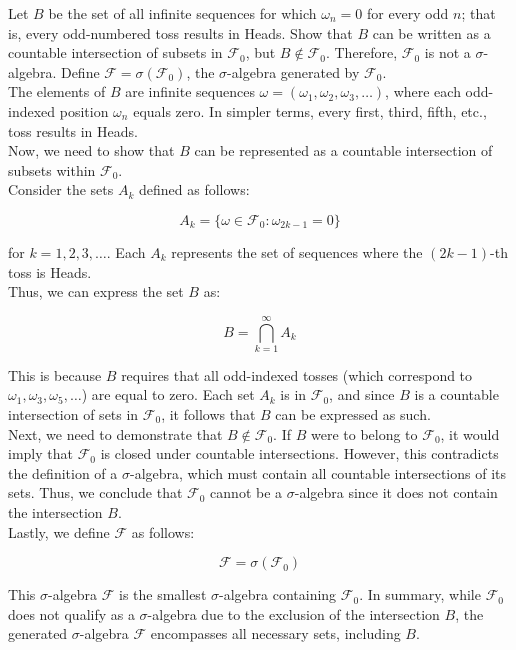 \begin{example}
    Let \( B \) be the set of all infinite sequences for which \( \omega_n = 0 \) for every odd \( n \); that is, every odd-numbered toss results in Heads. Show that \( B \) can be written as a countable intersection of subsets in \( \mathcal{F}_0 \), but \( B \notin \mathcal{F}_0 \). Therefore, \( \mathcal{F}_0 \) is not a \( \sigma \)-algebra. Define \( \mathcal{F} = \sigma(\mathcal{F}_0) \), the \( \sigma \)-algebra generated by \( \mathcal{F}_0 \).\\

    The elements of \( B \) are infinite sequences \( \omega = (\omega_1, \omega_2, \omega_3, \ldots) \), where each odd-indexed position \( \omega_n \) equals zero. In simpler terms, every first, third, fifth, etc., toss results in Heads.\\

    Now, we need to show that \( B \) can be represented as a countable intersection of subsets within \( \mathcal{F}_0 \). \\

    Consider the sets \( A_k \) defined as follows:

    \[
    A_k = \{ \omega \in \mathcal{F}_0 : \omega_{2k-1} = 0 \}
    \]

    for \( k = 1, 2, 3, \ldots \). Each \( A_k \) represents the set of sequences where the \( (2k-1) \)-th toss is Heads. \\

    Thus, we can express the set \( B \) as:

    \[
    B = \bigcap_{k=1}^{\infty} A_k
    \]

    This is because \( B \) requires that all odd-indexed tosses (which correspond to \( \omega_1, \omega_3, \omega_5, \ldots \)) are equal to zero. Each set \( A_k \) is in \( \mathcal{F}_0 \), and since \( B \) is a countable intersection of sets in \( \mathcal{F}_0 \), it follows that \( B \) can be expressed as such.\\

    Next, we need to demonstrate that \( B \notin \mathcal{F}_0 \). If \( B \) were to belong to \( \mathcal{F}_0 \), it would imply that \( \mathcal{F}_0 \) is closed under countable intersections. However, this contradicts the definition of a \( \sigma \)-algebra, which must contain all countable intersections of its sets. Thus, we conclude that \( \mathcal{F}_0 \) cannot be a \( \sigma \)-algebra since it does not contain the intersection \( B \).\\

    Lastly, we define \( \mathcal{F} \) as follows:

    \[
    \mathcal{F} = \sigma(\mathcal{F}_0)
    \]

    This \( \sigma \)-algebra \( \mathcal{F} \) is the smallest \( \sigma \)-algebra containing \( \mathcal{F}_0 \). In summary, while \( \mathcal{F}_0 \) does not qualify as a \( \sigma \)-algebra due to the exclusion of the intersection \( B \), the generated \( \sigma \)-algebra \( \mathcal{F} \) encompasses all necessary sets, including \( B \).

\end{example}

